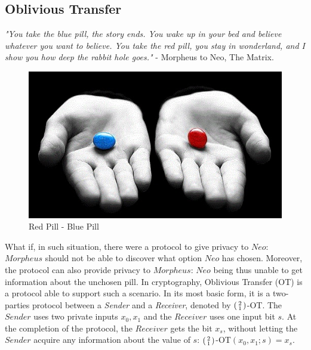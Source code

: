 \subsection{Oblivious Transfer}
\label{sec:obliviousTransferPre}

\textit{"You take the blue pill, the story ends. You wake up in your bed and
  believe whatever you want to believe. You take the red pill, you stay in
  wonderland, and I show you how deep the rabbit hole goes."} - Morpheus to Neo,
The Matrix.


\begin{figure}[htbp!] 
\centering    
\includegraphics[width=1.0\textwidth]{Chapter2/Figs/Raster/RedPillBluePill}
\caption[Minion]{Red Pill - Blue Pill}
\label{fig:RedPillBluePill}
\end{figure}

What if, in such situation, there were a protocol to give privacy to
\(Neo\): \(Morpheus\) should not be able to discover what option \(Neo\) has chosen. Moreover, the
protocol can also provide privacy to \(Morpheus\): \(Neo\) being thus unable to get information about the unchosen pill. In cryptography, Oblivious Transfer (OT) is a
protocol able to support such a scenario. 
In its most basic form, it is a
two-parties protocol between a \textit{Sender} and a \textit{Receiver}, denoted
by \(\begin{psmallmatrix} 2 \\ 1 \end{psmallmatrix} \)-OT. The \(Sender\) uses
two private inputs \(x_{0}, x_{1}\) and the \(Receiver\) uses one input bit
\(s\). At the completion of the protocol, the \(Receiver\) gets the bit
\(x_{s}\), without letting the \(Sender\) acquire any information about the value of
\(s\): \(\begin{psmallmatrix} 2 \\ 1 \end{psmallmatrix}
\)-OT\((x_{0},x_{1};s) = x_{s}\).

